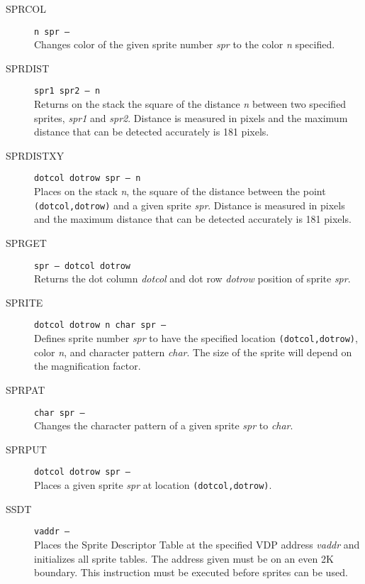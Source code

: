 \documentclass{article}
\begin{document}
\begin{multicols}{2}[]
\begin{description}
			\item[SPRCOL]\texttt{n spr --- }\\
				Changes color of the given sprite number \textit{spr} to the color
				\textit{n} specified.

			\item[SPRDIST]\texttt{spr1 spr2 --- n }\\
				Returns on the stack the square of the distance \textit{n} between
				two specified sprites, \textit{spr1} and \textit{spr2}. Distance is
				measured in pixels and the maximum distance that can be detected
				accurately is 181 pixels.

			\item[SPRDISTXY]\texttt{dotcol dotrow spr --- n }\\
				Places on the stack \textit{n}, the square of the distance between
				the point \verb|(dotcol,dotrow)| and a given sprite \textit{spr}.
				Distance is measured in pixels and the maximum distance that
				can be detected accurately is 181 pixels.

			\item[SPRGET]\texttt{spr --- dotcol dotrow }\\
				Returns the dot column \textit{dotcol} and dot row \textit{dotrow}
				position of sprite \textit{spr}.

			\item[SPRITE]\texttt{dotcol dotrow n char spr --- }\\
				Defines sprite number \textit{spr} to have the specified location
				\verb|(dotcol,dotrow)|, color \textit{n}, and character pattern
				\textit{char}. The size of the sprite will depend on the magnification
				factor.

			\item[SPRPAT]\texttt{char spr --- }\\
				Changes the character pattern of a given sprite \textit{spr} to
				\textit{char}.

			\item[SPRPUT]\texttt{dotcol dotrow spr --- }\\
				Places a given sprite \textit{spr} at location \verb|(dotcol,dotrow)|.



			\item[SSDT]\texttt{vaddr --- }\\
				Places the Sprite Descriptor Table at the specified VDP address
				\textit{vaddr} and initializes all sprite tables. The address given
				must be on an even 2K boundary. This instruction must be executed
				before sprites can be used.


\end{description}
\end{multicols}
\end{document}
